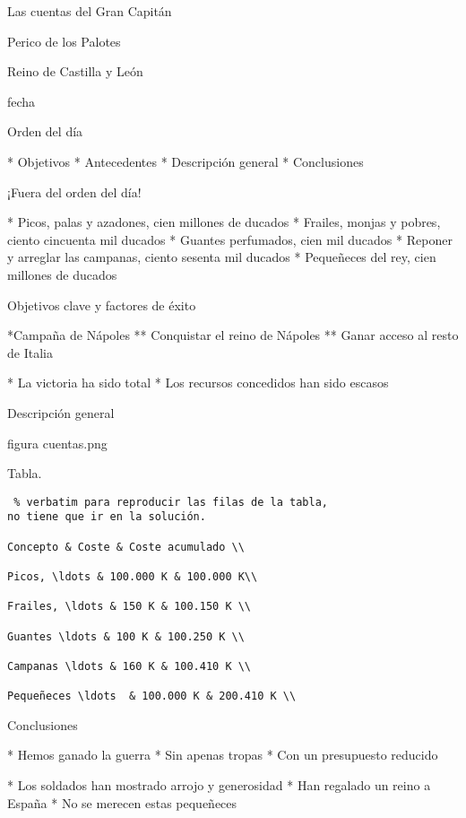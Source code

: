 \documentclass{beamer}
\begin{document}
Las cuentas del Gran Capitán

Perico de los Palotes

Reino de Castilla y León

fecha

Orden del día

* Objetivos
* Antecedentes
* Descripción general
* Conclusiones


¡Fuera del orden del día!

* Picos, palas y azadones, cien millones de ducados
* Frailes, monjas y pobres, ciento cincuenta mil ducados
* Guantes perfumados, cien mil ducados
* Reponer y arreglar las campanas, ciento sesenta mil ducados
* Pequeñeces del rey, cien millones de ducados 



Objetivos clave y  factores de éxito

*Campaña de Nápoles
 	** Conquistar el reino de Nápoles
	** Ganar acceso al resto de Italia



* La victoria ha sido total
* Los  recursos concedidos han sido escasos


Descripción general

figura cuentas.png


Tabla.%


\begin{verbatim} % verbatim para reproducir las filas de la tabla, 
no tiene que ir en la solución.

Concepto & Coste & Coste acumulado \\

Picos, \ldots & 100.000 K & 100.000 K\\

Frailes, \ldots & 150 K & 100.150 K \\

Guantes \ldots & 100 K & 100.250 K \\

Campanas \ldots & 160 K & 100.410 K \\

Pequeñeces \ldots  & 100.000 K & 200.410 K \\

\end{verbatim}



Conclusiones

* Hemos ganado la guerra
* Sin apenas tropas
* Con un presupuesto reducido


* Los soldados han mostrado arrojo y generosidad
* Han regalado un reino a España
* No se merecen estas pequeñeces
\end{document}
